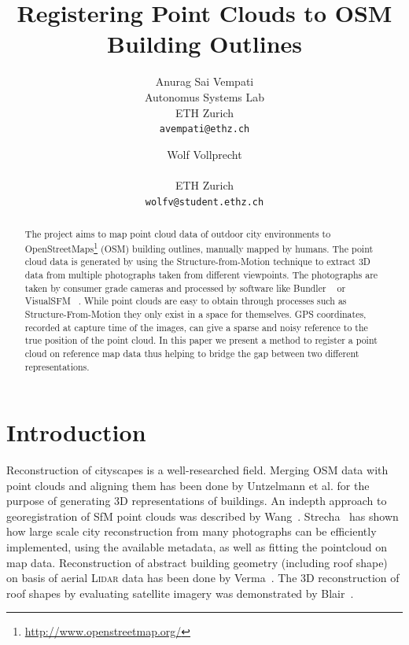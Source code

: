 \documentclass[10pt,twocolumn,letterpaper]{article}
\begin{document}
\title{Registering Point Clouds to OSM Building Outlines}

\author{Anurag Sai Vempati\\
Autonomus Systems Lab\\ ETH Zurich\\
{\tt\small avempati@ethz.ch}
\and
Wolf Vollprecht\\
\\ ETH Zurich
\\
{\tt\small wolfv@student.ethz.ch}
}

\maketitle

\begin{abstract}
  The project aims to map point cloud data of outdoor city environments to OpenStreetMaps\footnote{\url{http://www.openstreetmap.org/}} (OSM) building outlines, manually mapped by humans. The point cloud data is generated by using the Structure-from-Motion technique to extract 3D data from multiple photographs taken from different viewpoints. The photographs are taken by consumer grade cameras and processed by software like Bundler ~\cite{snavely2006photo} or VisualSFM ~\cite{visualsfm2011visual}. While point clouds are easy to obtain through processes such as Structure-From-Motion they only exist in a space for themselves. GPS coordinates, recorded at capture time of the images, can give a sparse and noisy reference to the true position of the point cloud. In this paper we present a method to register a point cloud on reference map data thus helping to bridge the gap between two different representations.
\end{abstract}

\section{Introduction}

Reconstruction of cityscapes is a well-researched field. Merging OSM data with point clouds and aligning them has been done by Untzelmann et al. \cite{6755957} for the purpose of generating 3D representations of buildings. An indepth approach to georegistration of SfM point clouds was described by Wang~\cite{wang2013accurate}. Strecha~\cite{EPFL-CONF-148247} has shown how large scale city reconstruction from many photographs can be efficiently implemented, using the available metadata, as well as fitting the pointcloud on map data. Reconstruction of abstract building geometry (including roof shape) on basis of aerial \textsc{Lidar} data has been done by Verma~\cite{verma20063d}. The 3D reconstruction of roof shapes by evaluating satellite imagery was demonstrated by Blair~\cite{blair2012towards}. 
\end{document}
